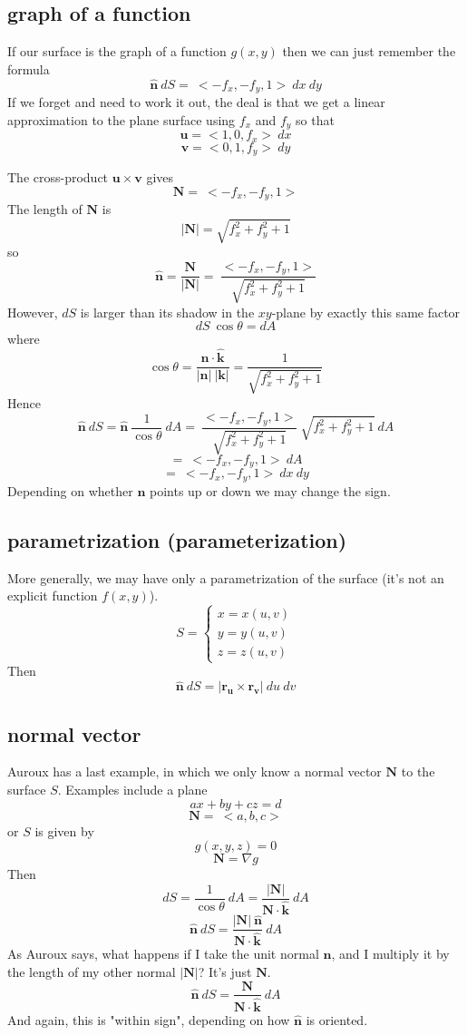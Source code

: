 \documentclass[11pt, oneside]{article}   	%
\begin{document}
\subsection*{graph of a function}
If our surface is the graph of a function $g(x,y)$ then we can just remember the formula
\[ \hat{\mathbf{n}} \ dS = \ <-f_x,-f_y,1>  \ dx \ dy  \]
If we forget and need to work it out, the deal is that we get a linear approximation to the plane surface using $f_x$ and $f_y$ so that
\[ \mathbf{u} = <1,0,f_x> \ dx \]
\[ \mathbf{v} = <0,1,f_y> \ dy \]

The cross-product $\mathbf{u} \times \mathbf{v}$ gives 
\[ \mathbf{N} = \ <-f_x,-f_y,1>  \]
The length of $\mathbf{N} $ is
\[ |\mathbf{N}| = \sqrt{f_x^2 + f_y^2 + 1} \]
so 
\[ \hat{\mathbf{n}} = \frac{\mathbf{N}}{|\mathbf{N}|} = \ \frac{<-f_x,-f_y,1>}{\sqrt{f_x^2 + f_y^2 + 1}}  \]
However, $dS$ is larger than its shadow in the $xy$-plane by exactly this same factor
\[ dS \ \cos \theta = dA \]
where 
\[\cos \theta = \frac{\mathbf{n} \cdot \hat{\mathbf{k}} }{|\mathbf{n}| \ |\mathbf{k}|}=  \frac{1}{\sqrt{f_x^2 + f_y^2 + 1}} \]
Hence
\[ \hat{\mathbf{n}} \ dS =  \hat{\mathbf{n}} \ \frac{1}{\cos \theta} \ dA = \ \frac{<-f_x,-f_y,1>}{\sqrt{f_x^2 + f_y^2 + 1}} \ \sqrt{f_x^2 + f_y^2 + 1} \ dA \]
\[ = \ <-f_x,-f_y,1>  \ dA  \]
\[ = \ <-f_x,-f_y,1>  \ dx \ dy  \]
Depending on whether $\mathbf{n}$ points up or down we may change the sign.

\subsection*{parametrization (parameterization)}
More generally, we may have only a parametrization of the surface (it's not an explicit function $f(x,y)$).
\[ S =
\left\{
	\begin{array}{l}
		x  = x(u,v)  \\
		y  = y(u,v)  \\
		z  = z(u,v)
	\end{array}
\right.
\]
Then
\[ \hat{\mathbf{n}} \ dS = | \mathbf{r_u} \times \mathbf{r_v} | \ du \ dv \]

\subsection*{normal vector}
Auroux has a last example, in which we only know a normal vector $\mathbf{N}$ to the surface $S$.  Examples include a plane 
\[ ax + by + cz = d  \]
\[ \mathbf{N} = \ <a,b,c> \]
or $S$ is given by 
\[ g(x,y,z) = 0 \]
\[ \mathbf{N} = \nabla g \]
Then
\[ dS = \frac{1}{\cos \theta} \ dA = \frac{|\mathbf{N}|}{\mathbf{N} \cdot \hat{\mathbf{k}}} \ dA \]
\[ \hat{\mathbf{n}} \ dS  = \frac{|\mathbf{N}| \ \hat{\mathbf{n}}}{\mathbf{N} \cdot \hat{\mathbf{k}}} \ dA \]
As Auroux says, what happens if I take the unit normal $\mathbf{n}$, and I multiply it by the length of my other normal $|\mathbf{N}|$?  It's just $\mathbf{N}$.
\[ \hat{\mathbf{n}} \ dS  = \frac{\mathbf{N}}{\mathbf{N} \cdot \hat{\mathbf{k}}} \ dA \]
And again, this is "within sign", depending on how $\hat{\mathbf{n}}$ is oriented.
\end{document}
